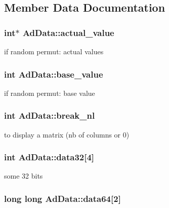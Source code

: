 \subsection{\-Member \-Data \-Documentation}
\hypertarget{classAdData_aa07e6b6e9c15152e0efa6f3b1e5e6934}{
\subsubsection[{actual\-\_\-value}]{\setlength{\rightskip}{0pt plus 5cm}int$\ast$ {\bf \-Ad\-Data\-::actual\-\_\-value}}}\label{classAdData_aa07e6b6e9c15152e0efa6f3b1e5e6934}
if random permut\-: actual values \hypertarget{classAdData_a156da702ebf4837590f4854dc7c2bc81}{
\subsubsection[{base\-\_\-value}]{\setlength{\rightskip}{0pt plus 5cm}int {\bf \-Ad\-Data\-::base\-\_\-value}}}\label{classAdData_a156da702ebf4837590f4854dc7c2bc81}
if random permut\-: base value \hypertarget{classAdData_a9c23c8706e4564395bb087d08e05f1f0}{
\subsubsection[{break\-\_\-nl}]{\setlength{\rightskip}{0pt plus 5cm}int {\bf \-Ad\-Data\-::break\-\_\-nl}}}\label{classAdData_a9c23c8706e4564395bb087d08e05f1f0}
to display a matrix (nb of columns or 0) \hypertarget{classAdData_a165ab98a7a4c0fc157e15ae5a9e42b7e}{
\subsubsection[{data32}]{\setlength{\rightskip}{0pt plus 5cm}int {\bf \-Ad\-Data\-::data32}\mbox{[}4\mbox{]}}}\label{classAdData_a165ab98a7a4c0fc157e15ae5a9e42b7e}
some 32 bits \hypertarget{classAdData_a79473c252c6e58b72813a6843dd1d815}{
\subsubsection[{data64}]{\setlength{\rightskip}{0pt plus 5cm}long long {\bf \-Ad\-Data\-::data64}\mbox{[}2\mbox{]}}}\label{classAdData_a79473c252c6e58b72813a6843dd1d815}
